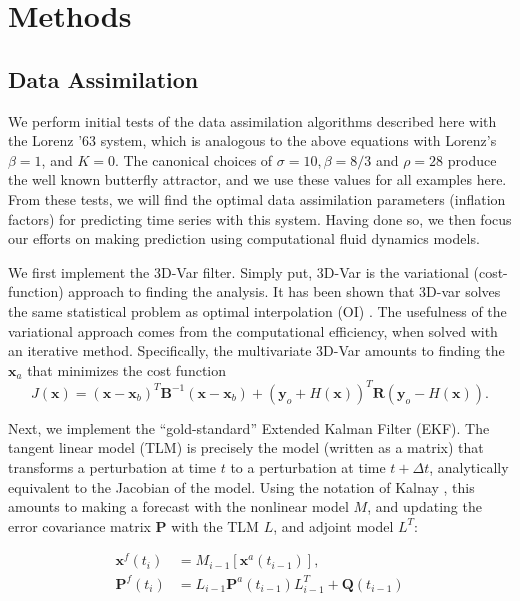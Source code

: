 \documentclass[pre,twocolumn,twoside,byrevtex,superscriptaddress]{revtex4}
\newcommand{\mbx}{\mathbf{x}}
\newcommand{\mby}{\mathbf{y}}
\newcommand{\mbB}{\mathbf{B}}
\newcommand{\mbR}{\mathbf{R}}
\newcommand{\mbP}{\mathbf{P}}
\begin{document}
\section*{Methods}

\subsection*{Data Assimilation}

We perform initial tests of the data assimilation algorithms described here with the Lorenz '63 system, which is analogous to the above equations with Lorenz's $\beta = 1$, and $K = 0$.
The canonical choices of $\sigma = 10, \beta = 8/3$ and $\rho = 28$ produce the well known butterfly attractor, and we use these values for all examples here.
From these tests, we will find the optimal data assimilation parameters (inflation factors) for predicting time series with this system.
Having done so, we then focus our efforts on making prediction using computational fluid dynamics models.

We first implement the 3D-Var filter.
Simply put, 3D-Var is the variational (cost-function) approach to finding the analysis.
It has been shown that 3D-var solves the same statistical problem as optimal interpolation (OI) \cite{lorenc1986analysis}.
The usefulness of the variational approach comes from the computational efficiency, when solved with an iterative method.
Specifically, the multivariate 3D-Var amounts to finding the $\mbx _a$ that minimizes the cost function
\begin{equation} J(\mbx) = (\mbx - \mbx_b) ^T \mbB ^{-1} (\mbx - \mbx_b) + (\mby_o + H(\mbx))^T\mbR (\mby_o - H(\mbx)) .\end{equation}

Next, we implement the ``gold-standard'' Extended Kalman Filter (EKF).
The tangent linear model (TLM) is precisely the model (written as a matrix) that transforms a perturbation at time $t$ to a perturbation at time $t+\Delta t$, analytically equivalent to the Jacobian of the model.
Using the notation of Kalnay \cite{kalnay2003}, this amounts to making a forecast with the nonlinear model $M$, and updating the error covariance matrix $\mbP$ with the TLM $L$, and adjoint model $L^T$:

\begin{align*} \mbx^f (t_i) &= M _{i-1} [\mbx ^a (t_{i-1} ) ],\\
\mbP^f (t_i ) &= L_{i-1} \mbP^a (t_{i-1} ) L^T _{i-1} + \mathbf{Q} (t_{i-1} ) \end{align*}
\end{document}
